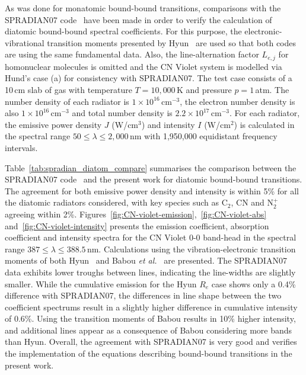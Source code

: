 As was done for monatomic bound-bound transitions, comparisons with the SPRADIAN07 code~\cite{hyun_phd} have been made in order to verify the calculation of diatomic bound-bound spectral coefficients.
For this purpose, the electronic-vibrational transition moments presented by Hyun~\cite{hyun_phd} are used so that both codes are using the same fundamental data.
Also, the line-alternation factor $L_{e,j}$ for homonuclear molecules is omitted and the CN Violet system is modelled via Hund's case (a) for consistency with SPRADIAN07.
The test case consists of a 10\,cm slab of gas with temperature $T=10,000$\,K and pressure $p=1$\,atm.
The number density of each radiator is $1 \times 10^{16}$\,cm$^{-3}$, the electron number density is also $1 \times 10^{16}$\,cm$^{-3}$ and total number density is $2.2 \times 10^{17}$\,cm$^{-3}$.
For each radiator, the emissive power density $J$ (W/cm$^3$) and intensity $I$ (W/cm$^2$) is calculated in the spectral range $ 50 \leq \lambda \leq 2,000$\,nm with 1,950,000 equidistant frequency intervals.  

\par

Table~\ref{tab:spradian_diatom_compare} summarises the comparison between the SPRADIAN07 code~\cite{hyun_phd} and the present work for diatomic bound-bound transitions.
The agreement for both emissive power density and intensity is within 5\% for all the diatomic radiators considered, with key species such as C$_2$, CN and N$_2^+$ agreeing within 2\%.
Figures~\ref{fig:CN-violet-emission},~\ref{fig:CN-violet-abs} and~\ref{fig:CN-violet-intensity} presents the emission coefficient, absorption coefficient and intensity spectra for the CN Violet 0-0 band-head in the spectral range $387 \leq \lambda \leq 388.5$\,nm.
Calculations using the vibration-electronic transition moments of both Hyun~\cite{hyun_phd} and Babou \textit{et al.}~\cite{BRP+2009} are presented.
The SPRADIAN07 data exhibits lower troughs between lines, indicating the line-widths are slightly smaller.
While the cumulative emission for the Hyun $R_e$ case shows only a 0.4\% difference with SPRADIAN07, the differences in line shape between the two coefficient spectrums result in a slightly higher difference in cumulative intensity of 0.6\%.
Using the transition moments of Babou results in 10\% higher intensity, and additional lines appear as a consequence of Babou considering more bands than Hyun.
Overall, the agreement with SPRADIAN07 is very good and verifies the implementation of the equations describing bound-bound transitions in the present work.

